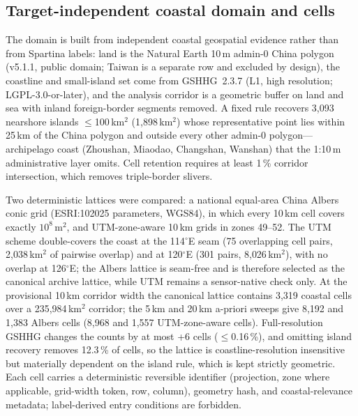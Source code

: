 \subsection{Target-independent coastal domain and cells}
The domain is built from independent coastal geospatial evidence
rather than from Spartina labels: land is the Natural Earth 10\,m
admin-0 China polygon (v5.1.1, public domain; Taiwan is a separate row
and excluded by design), the coastline and small-island set come from
GSHHG~2.3.7 (L1, high resolution; LGPL-3.0-or-later), and the
analysis corridor is a geometric buffer on land and sea with inland
foreign-border segments removed. A fixed rule recovers 3{,}093
nearshore islands $\leq$100\,km$^2$ (1{,}898\,km$^2$) whose
representative point lies within 25\,km of the China polygon and
outside every other admin-0 polygon---archipelago coast (Zhoushan,
Miaodao, Changshan, Wanshan) that the 1:10\,m administrative layer
omits. Cell retention requires at least 1\,\% corridor intersection,
which removes triple-border slivers.

Two deterministic lattices were compared: a national equal-area China
Albers conic grid (ESRI:102025 parameters, WGS84), in which every
10\,km cell covers exactly $10^{8}$\,m$^2$, and UTM-zone-aware 10\,km
grids in zones 49--52. The UTM scheme double-covers the coast at the
114$^{\circ}$E seam (75 overlapping cell pairs, 2{,}038\,km$^2$ of
pairwise overlap) and at 120$^{\circ}$E (301 pairs, 8{,}026\,km$^2$),
with no overlap at 126$^{\circ}$E; the Albers lattice is seam-free and
is therefore selected as the canonical archive lattice, while UTM
remains a sensor-native check only. At the provisional 10\,km corridor
width the canonical lattice contains 3{,}319 coastal cells over a
235{,}984\,km$^2$ corridor; the 5\,km and 20\,km a-priori sweeps give
8{,}192 and 1{,}383 Albers cells (8{,}968 and 1{,}557 UTM-zone-aware
cells). Full-resolution GSHHG changes the counts by
at most +6 cells ($\leq$0.16\,\%), and omitting island recovery
removes 12.3\,\% of cells, so the lattice is coastline-resolution
insensitive but materially dependent on the island rule, which is kept
strictly geometric. Each cell carries a deterministic reversible
identifier (projection, zone where applicable, grid-width token, row,
column), geometry hash, and coastal-relevance metadata; label-derived
entry conditions are forbidden.

